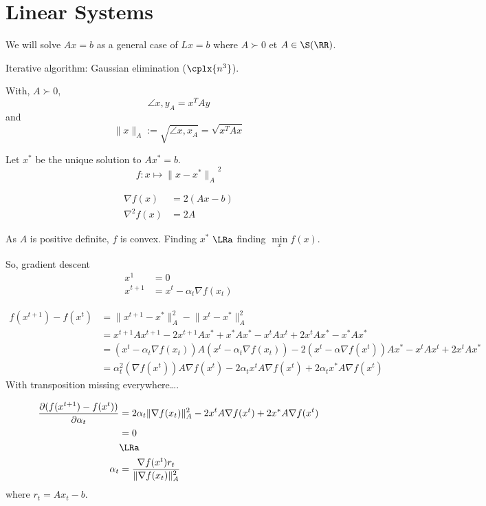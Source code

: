 \section{Linear Systems}

We will solve $Ax = b$ as a general case of $Lx=b$ where $A \succ 0$ et $A\in\S(\RR)$.

Iterative algorithm: Gaussian elimination ($\cplx{n^3}$).

\begin{notation}
    With, $A \succ 0$,
    \[
        \angle{x,y}_A = x^TAy
    \]
    and
    \[
        \lVert x \rVert_A := \sqrt{\angle{x,x}_A}= \sqrt{x^T A x}
    \]
\end{notation}

Let $x^*$ be the unique solution to $Ax^* = b$.
\[
    f : x \mapsto {\lVert x-x^* \rVert_A}^2
\]

\[
    \begin{aligned}
        \nabla f(x) &= 2(Ax - b)\\
        \nabla^2 f(x) &= 2A
    \end{aligned}
\]

As $A$ is positive definite, $f$ is convex. Finding $x^*$ $\LRa$ finding $\min\limits_x f(x)$.

So, gradient descent
\[
    \begin{aligned}
        x^1 &= 0\\
        x^{t+1} &= x^t - \alpha_t \nabla f(x_t)
    \end{aligned}
\]

\[
    \begin{aligned}
        f(x^{t+1}) - f(x^t) &= \lVert x^{t+1} - x^* \rVert_A^2 - \lVert x^{t} - x^* \rVert_A^2\\
        &= x^{t+1} A x^{t+1} - 2 x^{t+1}A x^* + x^*Ax^* - x^t A x^t + 2x^t A x^* - x^*Ax^*\\
        &= (x^t - \alpha_t \nabla f(x_t)) A (x^t - \alpha_t \nabla f(x_t)) -2 (x^t - \alpha\nabla f(x^t))A x^* - x^tAx^t + 2 x^t A x^*\\
        &=  \alpha_t^2(\nabla f(x^t)) A \nabla f(x^t) - 2\alpha_t x^t A \nabla f(x^t) +2\alpha_t x^* A \nabla f(x^t)
    \end{aligned}
\]
With transposition missing everywhere\dots.

\[
    \begin{aligned}
        \frac{\partial( f(x^{t+1}) - f(x^t))}{\partial \alpha_t} &= 2\alpha_t\lVert \nabla f(x_t) \rVert_A^2 - 2x^tA\nabla f(x^t) + 2x^* A \nabla f(x^t)\\
        &= 0\\
        &\LRa\\
        \alpha_t &= \frac{\nabla f(x^t) r_t}{\lVert \nabla f(x_t) \rVert_A^2}
    \end{aligned}
\]
where $r_t = A x_t -b$.

